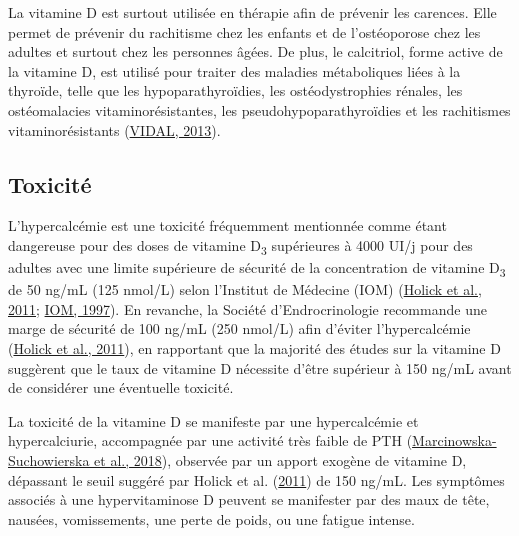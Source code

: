 \documentclass[
  letterpaper,
  DIV=11,
  numbers=noendperiod]{scrartcl}
\begin{document}
La vitamine D est surtout utilisée en thérapie afin de prévenir les
carences. Elle permet de prévenir du rachitisme chez les enfants et de
l'ostéoporose chez les adultes et surtout chez les personnes âgées. De
plus, le calcitriol, forme active de la vitamine D, est utilisé pour
traiter des maladies métaboliques liées à la thyroïde, telle que les
hypoparathyroïdies, les ostéodystrophies rénales, les ostéomalacies
vitaminorésistantes, les pseudohypoparathyroïdies et les rachitismes
vitaminorésistants (\protect\hyperlink{ref-VIDAL.2013}{VIDAL, 2013}).

\hypertarget{toxicituxe9}{%
\subsection{Toxicité}\label{toxicituxe9}}

L'hypercalcémie est une toxicité fréquemment mentionnée comme étant
dangereuse pour des doses de vitamine D\textsubscript{3} supérieures à
4000 UI/j pour des adultes avec une limite supérieure de sécurité de la
concentration de vitamine D\textsubscript{3} de 50 ng/mL (125 nmol/L)
selon l'Institut de Médecine (IOM)
(\protect\hyperlink{ref-Holick.2011}{Holick et al., 2011};
\protect\hyperlink{ref-IOM.1997}{IOM, 1997}). En revanche, la Société
d'Endrocrinologie recommande une marge de sécurité de 100 ng/mL (250
nmol/L) afin d'éviter l'hypercalcémie
(\protect\hyperlink{ref-Holick.2011}{Holick et al., 2011}), en
rapportant que la majorité des études sur la vitamine D suggèrent que le
taux de vitamine D nécessite d'être supérieur à 150 ng/mL avant de
considérer une éventuelle toxicité.

La toxicité de la vitamine D se manifeste par une hypercalcémie et
hypercalciurie, accompagnée par une activité très faible de PTH
(\protect\hyperlink{ref-Marcinowska-Suchowierska.2018}{Marcinowska-Suchowierska
et al., 2018}), observée par un apport exogène de vitamine D, dépassant
le seuil suggéré par Holick et al.
(\protect\hyperlink{ref-Holick.2011}{2011}) de 150 ng/mL. Les symptômes
associés à une hypervitaminose D peuvent se manifester par des maux de
tête, nausées, vomissements, une perte de poids, ou une fatigue intense.
\end{document}

